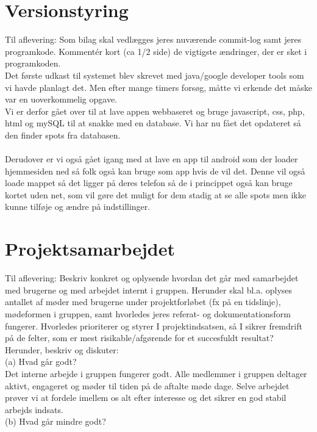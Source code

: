 \documentclass[12pt]{article}
\begin{document}
\pagebreak
\section{Versionstyring}
Til aflevering: Som bilag skal vedlægges jeres nuværende commit-log samt jeres
programkode. Kommentér kort (ca 1/2 side) de vigtigste ændringer, der er sket i programkoden.\\

Det første udkast til systemet blev skrevet med java/google developer tools som vi havde planlagt det. Men efter mange timers forsøg, måtte vi erkende det måske var en uoverkommelig opgave.\\
Vi er derfor gået over til at lave appen webbaseret og bruge javascript, css, php, html og mySQL til at snakke med en database. Vi har nu fået det opdateret så den finder spots fra databasen. \\
\\
Derudover er vi også gået igang med at lave en app til android som der loader hjemmesiden ned så folk også kan bruge som app hvis de vil det. Denne vil også loade mappet så det ligger på deres telefon så de i princippet også kan bruge kortet uden net, som vil gøre det muligt for dem stadig at se alle spots men ikke kunne tilføje og ændre på indstillinger.




\pagebreak
\section{Projektsamarbejdet}
Til aflevering: Beskriv konkret og oplysende hvordan det går med samarbejdet med brugerne
og med arbejdet internt i gruppen. Herunder skal bl.a. oplyses antallet af møder med brugerne under
projektforløbet (fx på en tidslinje), mødeformen i gruppen, samt hvorledes jeres referat- og
dokumentationsform fungerer. Hvorledes prioriterer og styrer I projektindsatsen, så I sikrer
fremdrift på de felter, som er mest risikable/afgørende for et succesfuldt resultat? Herunder, beskriv
og diskuter:\\

(a) Hvad går godt?\\
Det interne arbejde i gruppen fungerer godt. Alle medlemmer i gruppen deltager aktivt, engageret og møder til tiden på de aftalte møde dage. Selve arbejdet prøver vi at fordele imellem os alt efter interesse og det sikrer en god stabil arbejds indsats.\\

(b) Hvad går mindre godt?\\
\end{document}
